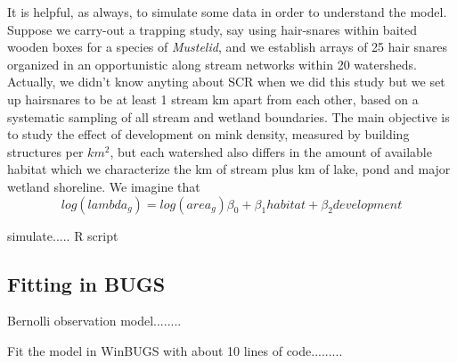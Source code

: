It is helpful, as always, to simulate some data in order to understand
the model. Suppose we carry-out a trapping study, say using
hair-snares within baited wooden boxes
for a species of {\it Mustelid}, and we establish arrays of
25 hair snares organized in an opportunistic along stream networks
within 
20 watersheds. Actually, we didn't know anyting about SCR when we did
this study but we set up hairsnares to be at least 1 stream km apart
from each other, based on a systematic sampling of all stream and
wetland boundaries. The main objective is to study the effect of
development on mink density, measured by building structures per
$km^2$,
 but each watershed also differs in the
amount of available habitat which we characterize the km of stream 
plus km of lake, pond and major wetland shoreline.
We imagine that
\[
log(lambda_{g}) = log(area_{g}) \beta_{0} + \beta_{1} habitat +
\beta_{2} development
\]

simulate..... R script

\subsection{Fitting in BUGS}

Bernolli observation model........


Fit the model in WinBUGS with about 10 lines of code.........




